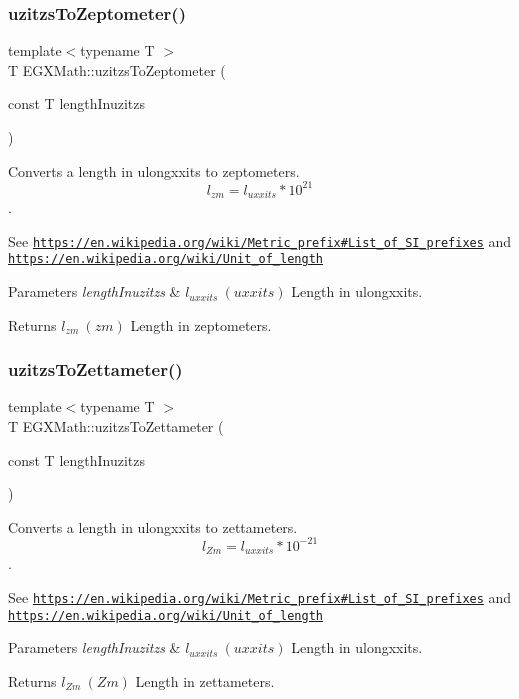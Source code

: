 \subsubsection{\texorpdfstring{uzitzs\+To\+Zeptometer()}{uzitzsToZeptometer()}}
{\footnotesize\ttfamily template$<$typename T $>$ \\
T E\+G\+X\+Math\+::uzitzs\+To\+Zeptometer (\begin{DoxyParamCaption}\item[{const T}]{length\+Inuzitzs }\end{DoxyParamCaption})}



Converts a length in ulongxxits to zeptometers. \[ l_{zm}=l_{uxxits} * 10^{21} \]. 

See \href{https://en.wikipedia.org/wiki/Metric_prefix#List_of_SI_prefixes}{\tt https\+://en.\+wikipedia.\+org/wiki/\+Metric\+\_\+prefix\#\+List\+\_\+of\+\_\+\+S\+I\+\_\+prefixes} and \href{https://en.wikipedia.org/wiki/Unit_of_length}{\tt https\+://en.\+wikipedia.\+org/wiki/\+Unit\+\_\+of\+\_\+length} 
\begin{DoxyParams}{Parameters}
{\em length\+Inuzitzs} & $ l_{uxxits}\ (uxxits)$ Length in ulongxxits. \\
\hline
\end{DoxyParams}
\begin{DoxyReturn}{Returns}
$ l_{zm}\ (zm)$ Length in zeptometers. 
\end{DoxyReturn}
\mbox{\label{group___e_g_x_math-_conversions-_length_conversions-uzitzs-_s_i_ga43f793911855da08c6649eb9b059d9c2}} 
\subsubsection{\texorpdfstring{uzitzs\+To\+Zettameter()}{uzitzsToZettameter()}}
{\footnotesize\ttfamily template$<$typename T $>$ \\
T E\+G\+X\+Math\+::uzitzs\+To\+Zettameter (\begin{DoxyParamCaption}\item[{const T}]{length\+Inuzitzs }\end{DoxyParamCaption})}



Converts a length in ulongxxits to zettameters. \[ l_{Zm}=l_{uxxits} * 10^{-21} \]. 

See \href{https://en.wikipedia.org/wiki/Metric_prefix#List_of_SI_prefixes}{\tt https\+://en.\+wikipedia.\+org/wiki/\+Metric\+\_\+prefix\#\+List\+\_\+of\+\_\+\+S\+I\+\_\+prefixes} and \href{https://en.wikipedia.org/wiki/Unit_of_length}{\tt https\+://en.\+wikipedia.\+org/wiki/\+Unit\+\_\+of\+\_\+length} 
\begin{DoxyParams}{Parameters}
{\em length\+Inuzitzs} & $ l_{uxxits}\ (uxxits)$ Length in ulongxxits. \\
\hline
\end{DoxyParams}
\begin{DoxyReturn}{Returns}
$ l_{Zm}\ (Zm)$ Length in zettameters. 
\end{DoxyReturn}
